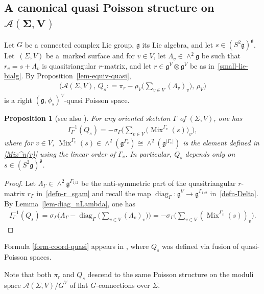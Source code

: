 \documentclass[10pt,a4paper]{amsart}
\numberwithin{equation}{section}
\newtheorem{Proposition}[Theorem]{Proposition}
{ \theoremstyle{definition}
\newtheorem{Definition}[Theorem]{Definition}
\newtheorem{Example}[Theorem]{Example}
\newtheorem{Remark}[Theorem]{Remark} }
\def \g {\mathfrak{a}}
\def \g {\mathfrak{g}}
\def \A {{\mathcal{A}}}
\DeclareMathOperator{\diag}{diag}
\DeclareMathOperator{\Mix}{Mix}
\def \sV {{\scriptscriptstyle V}}
\def \sGam {{\scriptscriptstyle \Gamma}}
\begin{document}
\subsection[A canonical quasi Poisson structure on $\A(\Sigma, V)$]{A canonical quasi Poisson structure on $\boldsymbol{\A(\Sigma, V)}$} \label{subsec-quasip}

Let $G$ be a connected complex Lie group, $\g$ its Lie algebra, and let $s \in (S^2\g)^\g$. Let~$(\Sigma, V)$ be a~marked surface and for $v \in V$, let $\Lambda_v \in \wedge^2 \g$ be such that $r_v = s + \Lambda_v$ is quasitriangular $r$-matrix, and let $r \in \g^{\sV} \otimes \g^{\sV}$ be as in~\eqref{small-lie-bialg}. By Proposition~\ref{lem-equiv-quasi},
\begin{gather*}
\bigg(\A(\Sigma, V), \, Q_s: = \pi_r - \rho_{\sV} \bigg( \sum_{v \in V} (\Lambda_v)_v \bigg), \, \rho_{\sV} \bigg)
\end{gather*}
is a right $(\g, \phi_s)^{\sV}$-quasi Poisson space.

\begin{Proposition}[see also \cite{LBS1}] \label{coord-quasi}
For any oriented skeleton $\Gamma$ of $(\Sigma, V)$, one has
\begin{gather}
I_\Gamma^{-1}(Q_s) = -\sigma_{\sGam} \bigg( \sum_{v \in V} \big(\Mix^{\sGam_v}(s)\big)_v \bigg), \label{form-coord-quasi}
\end{gather}
where for $v \in V$, $\Mix^{\sGam_v}(s) \in \wedge^2 (\g^{\sGam_v}) \cong \wedge^2 (\g^{|\sGam_v |})$ is the element defined in \eqref{Mix^n(r)} using the linear order of $\Gamma_v$. In particular, $Q_s$ depends only on $s \in (S^2\g)^\g$.
\end{Proposition}
\begin{proof} Let $\Lambda_\sGam \in \wedge^2 \g^{\sGam_{1/2}}$ be the anti-symmetric part of the quasitriangular $r$-matrix $r_\sGam$ in~\eqref{defn-r_sgam} and recall the map $\diag_\sGam\colon \g^\sV \to \g^{\sGam_{1/2}}$ in~\eqref{defn-Delta}. By Lemma~\ref{lem-diag_nLambda}, one has
\begin{gather*}
I_\Gamma^{-1}(Q_s) = \sigma_{\sGam} \bigg( \Lambda_\sGam - \diag_{\sGam} \bigg(\sum_{v \in V} (\Lambda_v)_v \bigg) \bigg) = -\sigma_{\sGam} \bigg( \sum_{v \in V} (\Mix^{\sGam_v}(s))_v \bigg).\tag*{\qed}
\end{gather*}\renewcommand{\qed}{}
\end{proof}

\begin{Remark} Formula \eqref{form-coord-quasi} appears in \cite[Section~4]{LBS1}, where $Q_s$ was def\/ined via fusion of quasi-Poisson spaces.

Note that both $\pi_r$ and $Q_s$ descend to the same Poisson structure on the moduli space $\A(\Sigma, V)/G^V$ of f\/lat $G$-connections over $\Sigma$.
\end{Remark}
\end{document}
